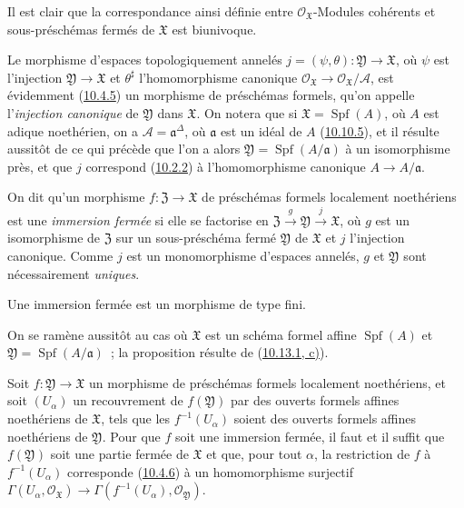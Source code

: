 Il est clair que la correspondance ainsi définie entre
$\mathscr{O}_{\mathfrak{X}}$-Modules cohérents et sous-préschémas fermés de
$\mathfrak{X}$ est biunivoque.

Le morphisme d'espaces topologiquement annelés
$j=(\psi,\theta):\mathfrak{Y}\to\mathfrak{X}$, où $\psi$ est l'injection
$\mathfrak{Y}\to\mathfrak{X}$ et $\theta^\sharp$ l'homomorphisme canonique
$\mathscr{O}_{\mathfrak{X}}\to\mathscr{O}_{\mathfrak{X}}/\mathscr{A}$, est
évidemment (\hyperref[I.10.4.5-fr]{10.4.5}) un morphisme de préschémas formels,
qu'on appelle l'\emph{injection canonique} de $\mathfrak{Y}$ dans $\mathfrak{X}$.
On notera que si $\mathfrak{X}=\operatorname{Spf}(A)$, où $A$ est adique
noethérien, on a $\mathscr{A}=\mathfrak{a}^\Delta$, où $\mathfrak{a}$ est un
idéal de $A$ (\hyperref[I.10.10.5-fr]{10.10.5}), et il résulte aussitôt de ce
qui précède que l'on a alors
$\mathfrak{Y}=\operatorname{Spf}(A/\mathfrak{a})$ à un isomorphisme près, et que
$j$ correspond (\hyperref[I.10.2.2-fr]{10.2.2}) à l'homomorphisme canonique
$A\to A/\mathfrak{a}$.

On dit qu'un morphisme $f:\mathfrak{Z}\to\mathfrak{X}$ de préschémas formels
localement noethériens est une \emph{immersion fermée} si elle se factorise en
$\mathfrak{Z}\xrightarrow{g}\mathfrak{Y}\xrightarrow{j}\mathfrak{X}$, où $g$
est un isomorphisme de $\mathfrak{Z}$ sur un sous-préschéma fermé
$\mathfrak{Y}$ de $\mathfrak{X}$ et $j$ l'injection canonique. Comme $j$ est un
monomorphisme d'espaces annelés, $g$ et $\mathfrak{Y}$ sont nécessairement
\emph{uniques}.

\begin{proposition}[10.14.3]
\label{I.10.14.3-fr}
Une immersion fermée est un morphisme de type fini.
\end{proposition}

On se ramène aussitôt au cas où $\mathfrak{X}$ est un schéma formel affine
$\operatorname{Spf}(A)$ et $\mathfrak{Y}=\operatorname{Spf}(A/\mathfrak{a})$~;
la proposition résulte de (\hyperref[I.10.13.1-fr]{10.13.1, c)}).

\begin{lemma}[10.14.4]
\label{I.10.14.4-fr}
Soit $f:\mathfrak{Y}\to\mathfrak{X}$ un morphisme de préschémas formels
localement noethériens, et soit $(U_\alpha)$ un recouvrement de
$f(\mathfrak{Y})$ par des ouverts formels affines noethériens de
$\mathfrak{X}$, tels que les $f^{-1}(U_\alpha)$ soient des ouverts formels
affines noethériens de $\mathfrak{Y}$. Pour que $f$ soit une immersion fermée,
il faut et il suffit que $f(\mathfrak{Y})$ soit une partie fermée de
$\mathfrak{X}$ et que, pour tout $\alpha$, la restriction de $f$ à
$f^{-1}(U_\alpha)$ corresponde (\hyperref[I.10.4.6-fr]{10.4.6}) à un
homomorphisme surjectif
$\Gamma(U_\alpha,\mathscr{O}_{\mathfrak{X}})\to
\Gamma(f^{-1}(U_\alpha),\mathscr{O}_{\mathfrak{Y}})$.
\end{lemma}

